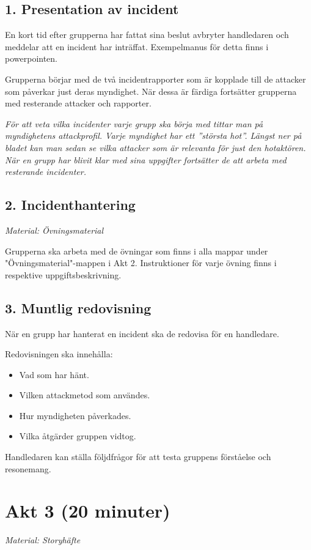 \documentclass{article}
\begin{document}
\subsection{1. Presentation av incident}

En kort tid efter grupperna har fattat sina beslut avbryter handledaren och meddelar att en incident har inträffat. Exempelmanus för detta finns i powerpointen.

Grupperna börjar med de två incidentrapporter som är kopplade till de attacker som påverkar just deras myndighet. När dessa är färdiga fortsätter grupperna med resterande attacker och rapporter.

\textit{För att veta vilka incidenter varje grupp ska börja med tittar man på myndighetens attackprofil. Varje myndighet har ett ”största hot”. Längst ner på bladet kan man sedan se vilka attacker som är relevanta för just den hotaktören. När en grupp har blivit klar med sina uppgifter fortsätter de att arbeta med resterande incidenter.}

\subsection{2. Incidenthantering}
\textit{Material: Övningsmaterial}

Grupperna ska arbeta med de övningar som finns i alla mappar under "Övningsmaterial"-mappen i Akt 2. Instruktioner för varje övning finns i respektive uppgiftsbeskrivning.

\subsection{3. Muntlig redovisning}

När en grupp har hanterat en incident ska de redovisa för en handledare.

Redovisningen ska innehålla:
\begin{itemize}
    \item Vad som har hänt.
    \item Vilken attackmetod som användes.
    \item Hur myndigheten påverkades.
    \item Vilka åtgärder gruppen vidtog.
\end{itemize}

Handledaren kan ställa följdfrågor för att testa gruppens förståelse och resonemang.

\section{Akt 3 (20 minuter)}
\textit{Material: Storyhäfte}
\end{document}
